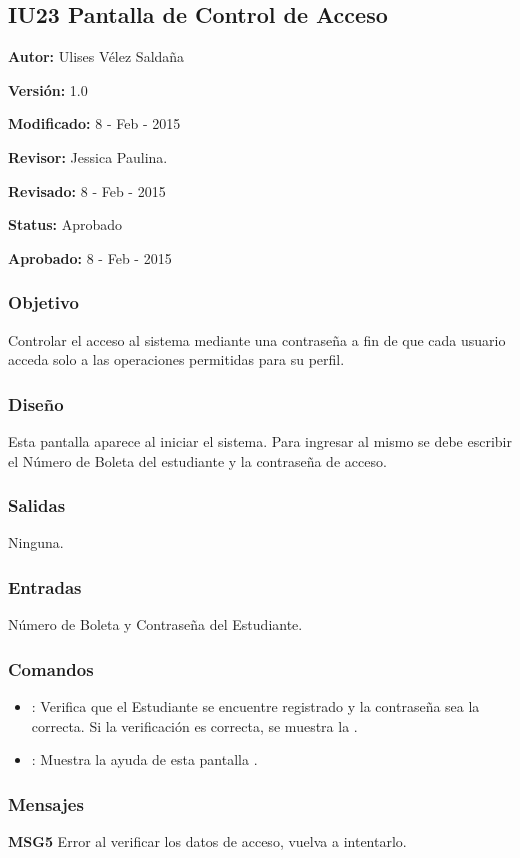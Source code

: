 \subsection{IU23 Pantalla de Control de Acceso}

\begin{objetivos}
	\item {\bf Autor:} Ulises Vélez Saldaña
	\item {\bf Versión:} 1.0
	\item {\bf Modificado:} 8 - Feb - 2015
	\item {\bf Revisor:} Jessica Paulina.
	\item {\bf Revisado:} 8 - Feb - 2015
	\item {\bf Status:} Aprobado
	\item {\bf Aprobado:} 8 - Feb - 2015
\end{objetivos}

\subsubsection{Objetivo}
	Controlar el acceso al sistema mediante una contraseña a fin de que cada usuario acceda solo a las operaciones permitidas para su perfil.

\subsubsection{Diseño}
	Esta pantalla aparece al iniciar el sistema. Para ingresar al mismo se debe escribir el Número de Boleta del estudiante y la contraseña de acceso. 


\subsubsection{Salidas}

	Ninguna.

\subsubsection{Entradas}
Número de Boleta y Contraseña del Estudiante.

\subsubsection{Comandos}
\begin{itemize}
	\item {}: Verifica que el Estudiante se encuentre registrado y la contraseña sea la correcta. Si la verificación es correcta, se muestra la .
	\item {}: Muestra la ayuda de esta pantalla .
\end{itemize}

\subsubsection{Mensajes}
	\begin{Citemize}
		\item {\bf MSG5} Error al verificar los datos de acceso, vuelva a intentarlo.
	\end{Citemize}